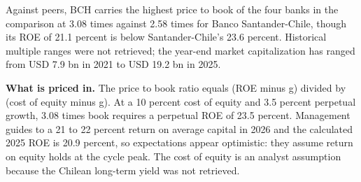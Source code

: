 \documentclass[10pt,a4paper]{article}
\begin{document}
Against peers, BCH carries the highest price to book of the four banks in the comparison at 3.08 times against 2.58 times for Banco Santander-Chile, though its ROE of 21.1 percent is below Santander-Chile's 23.6 percent. Historical multiple ranges were not retrieved; the year-end market capitalization has ranged from USD 7.9 bn in 2021 to USD 19.2 bn in 2025.

\textbf{What is priced in.} The price to book ratio equals (ROE minus g) divided by (cost of equity minus g). At a 10 percent cost of equity and 3.5 percent perpetual growth, 3.08 times book requires a perpetual ROE of 23.5 percent. Management guides to a 21 to 22 percent return on average capital in 2026 and the calculated 2025 ROE is 20.9 percent, so expectations appear optimistic: they assume return on equity holds at the cycle peak. The cost of equity is an analyst assumption because the Chilean long-term yield was not retrieved.
\end{document}
